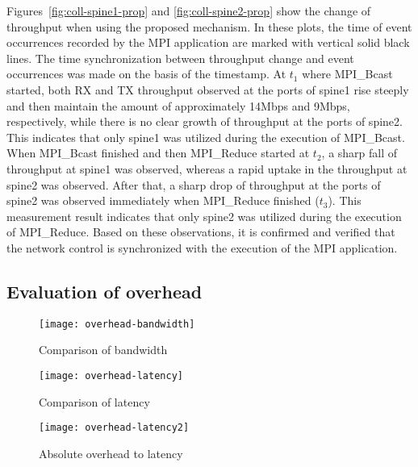 Figures~\ref{fig:coll-spine1-prop} and \ref{fig:coll-spine2-prop} show
the change of throughput when using the proposed mechanism. In these
plots, the time of event occurrences recorded by the MPI application are
marked with vertical solid black lines. The time synchronization between
throughput change and event occurrences was made on the basis of the
timestamp. At \(t_1\) where MPI\_Bcast started, both RX and TX
throughput observed at the ports of spine1 rise steeply and then
maintain the amount of approximately 14Mbps and 9Mbps, respectively,
while there is no clear growth of throughput at the ports of spine2.
This indicates that only spine1 was utilized during the execution of
MPI\_Bcast. When MPI\_Bcast finished and then MPI\_Reduce started at
\(t_2\), a sharp fall of throughput at spine1 was observed, whereas a
rapid uptake in the throughput at spine2 was observed. After that, a
sharp drop of throughput at the ports of spine2 was observed immediately
when MPI\_Reduce finished (\(t_3\)). This measurement result indicates
that only spine2 was utilized during the execution of MPI\_Reduce. Based
on these observations, it is confirmed and verified that the network
control is synchronized with the execution of the MPI application.

\hypertarget{evaluation-of-overhead}{%
\subsection{Evaluation of overhead}\label{evaluation-of-overhead}}

\begin{figure}[htbp]
    \centering
    \texttt{[image: overhead-bandwidth]}
    \caption{Comparison of bandwidth}
    \label{fig:overhead-bandwidth}
\end{figure}

\begin{figure}[htbp]
    \centering
    \texttt{[image: overhead-latency]}
    \caption{Comparison of latency}
    \label{fig:overhead-latency}
\end{figure}

\begin{figure}[htbp]
    \centering
    \texttt{[image: overhead-latency2]}
    \caption{Absolute overhead to latency}
    \label{fig:overhead-latency-2}
\end{figure}

